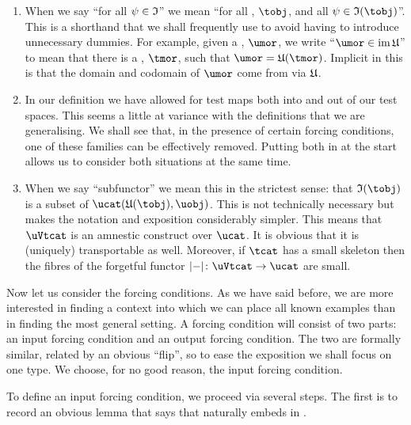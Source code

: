 \documentclass[%
12pt,%
arxiv,%
defaults
]{myclass}
\begin{document}
\begin{remark}
\label{rk:presmth}
\begin{enumerate}
\item When we say ``for all \(\ifn \in \itest\)'' we mean ``for all \tobjs, \(\tobj\), and all \(\ifn \in \itest(\tobj)\)''.
This is a shorthand that we shall frequently use to avoid having to introduce unnecessary dummies.
For example, given a \umor, \(\umor\), we write ``\(\umor \in \im \ufunc\)'' to mean that there is a \tmor, \(\tmor\), such that \(\umor = \ufunc(\tmor)\).
Implicit in this is that the domain and codomain of \(\umor\) come from \tobjs via \(\ufunc\).

\item In our definition we have allowed for test maps both into and out of our test spaces.
This seems a little at variance with the definitions that we are generalising.
We shall see that, in the presence of certain forcing conditions, one of these families can be effectively removed.
Putting both in at the start allows us to consider both situations at the same time.

\item
\label{it:sub}
When we say ``subfunctor'' we mean this in the strictest sense: that \(\itest(\tobj)\) is a subset of \(\Hom{\ucat}{\ufunc(\tobj)}{\uobj}\).
This is not technically necessary but makes the notation and exposition considerably simpler.
This means that \(\uVtcat\) is an amnestic construct over \(\ucat\).
It is obvious that it is (uniquely) transportable as well.
Moreover, if \(\tcat\) has a small skeleton then the fibres of the forgetful functor \(\forfunc \colon \uVtcat \to \ucat\) are small.
\end{enumerate}
\end{remark}

Now let us consider the forcing conditions.
As we have said before, we are more interested in finding a context into which we can place all known examples than in finding the most general setting.
A forcing condition will consist of two parts: an input forcing condition and an output forcing condition.
The two are formally similar, related by an obvious ``flip'', so to ease the exposition we shall focus on one type.
We choose, for no good reason, the input forcing condition.

To define an input forcing condition, we proceed via several steps.
The first is to record an obvious lemma that says that \tcat naturally embeds in \uVtcat.
\end{document}
